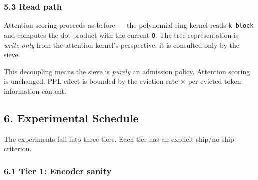 \documentclass[
  11pt,
]{article}
\begin{document}
\hypertarget{read-path}{%
\subsubsection{5.3 Read path}\label{read-path}}

Attention scoring proceeds as before --- the polynomial-ring kernel
reads \texttt{k\_block} and computes the dot product with the current
\texttt{Q}. The tree representation is \emph{write-only} from the
attention kernel's perspective: it is consulted only by the sieve.

This decoupling means the sieve is \emph{purely} an admission policy.
Attention scoring is unchanged. PPL effect is bounded by the
eviction-rate × per-evicted-token information content.

\hypertarget{experimental-schedule}{%
\subsection{6. Experimental Schedule}\label{experimental-schedule}}

The experiments fall into three tiers. Each tier has an explicit
ship/no-ship criterion.

\hypertarget{tier-1-encoder-sanity}{%
\subsubsection{6.1 Tier 1: Encoder sanity}\label{tier-1-encoder-sanity}}
\end{document}
